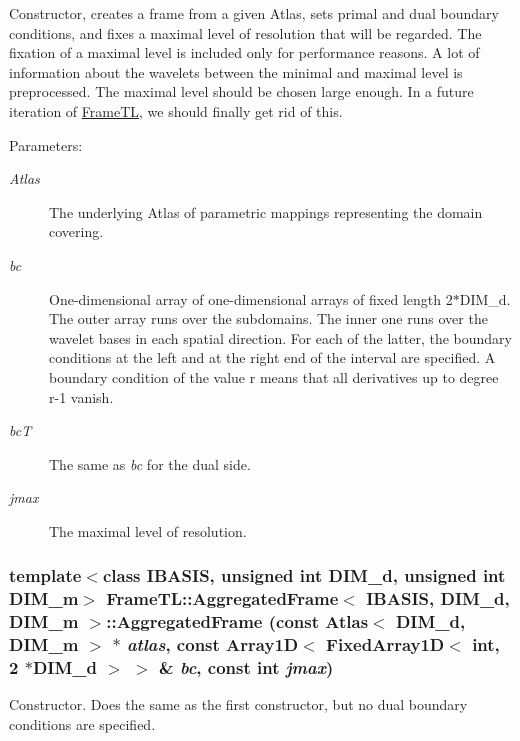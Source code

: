 Constructor, creates a frame from a given Atlas, sets primal and dual boundary conditions, and fixes a maximal level of resolution that will be regarded. The fixation of a maximal level is included only for performance reasons. A lot of information about the wavelets between the minimal and maximal level is preprocessed. The maximal level should be chosen large enough. In a future iteration of \hyperlink{namespaceFrameTL}{FrameTL}, we should finally get rid of this.

\begin{Desc}
\item[Parameters:]
\begin{description}
\item[{\em Atlas}]The underlying Atlas of parametric mappings representing the domain covering. \item[{\em bc}]One-dimensional array of one-dimensional arrays of fixed length 2$\ast$DIM\_\-d. The outer array runs over the subdomains. The inner one runs over the wavelet bases in each spatial direction. For each of the latter, the boundary conditions at the left and at the right end of the interval are specified. A boundary condition of the value r means that all derivatives up to degree r-1 vanish. \item[{\em bcT}]The same as {\em bc\/} for the dual side. \item[{\em jmax}]The maximal level of resolution. \end{description}
\end{Desc}
\hypertarget{classFrameTL_1_1AggregatedFrame_1d3c8966d03cbff2678aabd1d8012b3b}{
\subsubsection[AggregatedFrame]{\setlength{\rightskip}{0pt plus 5cm}template$<$class IBASIS, unsigned int DIM\_\-d, unsigned int DIM\_\-m$>$ {\bf FrameTL::AggregatedFrame}$<$ IBASIS, DIM\_\-d, DIM\_\-m $>$::{\bf AggregatedFrame} (const Atlas$<$ DIM\_\-d, DIM\_\-m $>$ $\ast$ {\em atlas}, \/  const Array1D$<$ FixedArray1D$<$ int, 2 $\ast$DIM\_\-d $>$ $>$ \& {\em bc}, \/  const int {\em jmax})}}
\label{classFrameTL_1_1AggregatedFrame_1d3c8966d03cbff2678aabd1d8012b3b}


Constructor. Does the same as the first constructor, but no dual boundary conditions are specified. 

